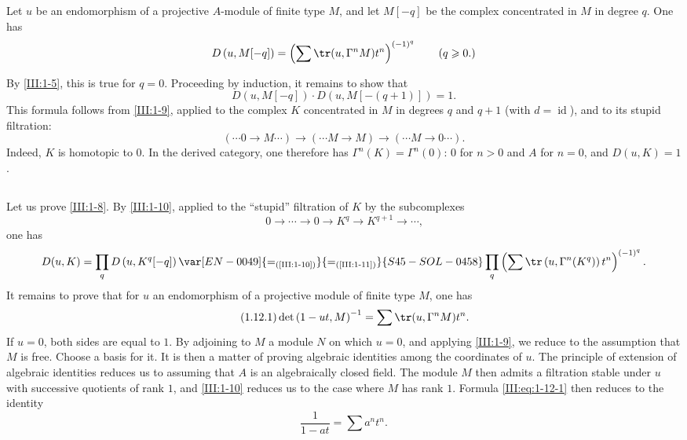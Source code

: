 \begin{lemma_}\label{III:1-11}
Let $u$ be an endomorphism of a projective $A$-module of finite type $M$, and
let $M[-q]$ be the complex concentrated in $M$ in degree $q$. One has
\[
  D\left(u,M[-q]\right) = \left(\sum \tr(u,\Gamma^n M) t^n\right)^{(-1)^q} \qquad \text{($q\geqslant 0$.)}
\]
\end{lemma_}






By \ref{III:1-5}, this is true for $q=0$. Proceeding by induction, it remains
to show that
\[
  D\left(u,M[-q]\right) \cdot D\left(u,M[-(q+1)]\right) = 1 \text{.}
\]
This formula follows from \ref{III:1-9}, applied to the complex $K$
concentrated in $M$ in degrees $q$ and $q+1$ (with
$d=\operatorname{id}$), and to its stupid filtration:
\[
  (\cdots 0 \to M \cdots) \to (\cdots M \to M) \to (\cdots M \to 0 \cdots) \text{.}
\]
Indeed, $K$ is homotopic to $0$. In the derived category, one therefore has
$\Gamma^n(K)=\Gamma^n(0)$: $0$ for $n>0$ and $A$ for $n=0$, and $D(u,K)=1$.





\subsection{}\label{III:1-12}

Let us prove \ref{III:1-8}. By \ref{III:1-10}, applied to the ``stupid''
filtration of $K$ by the subcomplexes
\[
  0 \to \cdots \to 0 \to K^q \to K^{q+1} \to \cdots \text{,}
\]
one has
\[
  D(u,K) = \prod_q D\left(u,K^q[-q]\right) \var[EN-0049]{=_{\text{(\ref{III:1-10})}}}{=_{\text{(\ref{III:1-11})}}}{S45-SOL-0458} \prod_q \left(\sum \tr\left(u,\Gamma^n(K^q)\right) t^n \right)^{(-1)^q} \text{.}
\]
It remains to prove that for $u$ an endomorphism of a projective module of
finite type $M$, one has
\begin{equation*}\tag{1.12.1}\label{III:eq:1-12-1}
  \det\left(1-u t,M\right)^{-1} = \sum \tr(u,\Gamma^n M) t^n \text{.}
\end{equation*}
If $u=0$, both sides are equal to $1$. By adjoining to $M$ a module $N$ on
which $u=0$, and applying \ref{III:1-9}, we reduce to the assumption that $M$
is free. Choose a basis for it. It is then a matter of proving algebraic
identities among the coordinates of $u$. The principle of extension of
algebraic identities reduces us to assuming that $A$ is an algebraically
closed field. The module $M$ then admits a filtration stable under $u$ with
successive quotients of rank $1$, and \ref{III:1-10} reduces us to the case
where $M$ has rank $1$. Formula \eqref{III:eq:1-12-1} then reduces to the
identity
\[
  \frac{1}{1-a t} = \sum a^n t^n \text{.}
\]





